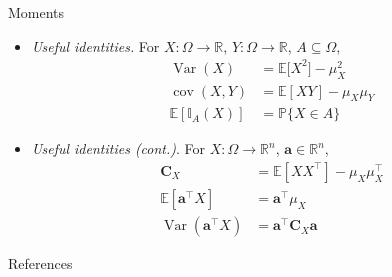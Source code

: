 \documentclass{beamer}
\numberwithin{equation}{section}
\begin{document}
\begin{frame}{Moments}
    \begin{itemize}
        \item
        \textit{Useful identities.} For $ X : \Omega \rightarrow \mathbb{R} $,
        $ Y : \Omega \rightarrow \mathbb{R} $, $ A \subseteq \Omega $,
        \begin{equation*}
            \begin{aligned}
                \operatorname{Var}(X) & = \mathbb{E}\big[X^2\big] - \mu_X^2 \\
                \operatorname{cov}(X, Y) & = \mathbb{E}[XY] - \mu_X\mu_Y \\
                \mathbb{E}[\mathbb{I}_A(X)] & = \mathbb{P}\{X \in A\}
            \end{aligned}
        \end{equation*}

        \item
        \textit{Useful identities (cont.)}. For $ X : \Omega \rightarrow
        \mathbb{R}^n $, $ \mathbf{a} \in \mathbb{R}^n $,
        \begin{equation*}
            \begin{aligned}
                \mathbf{C}_X & = \mathbb{E}\left[XX^\top\right] -
                    \mu_X\mu_X^\top \\
                \mathbb{E}\left[\mathbf{a}^\top X\right] & =
                    \mathbf{a}^\top\mu_X \\
                \operatorname{Var}\left(\mathbf{a}^\top X\right) & =
                    \mathbf{a}^\top\mathbf{C}_X\mathbf{a}
            \end{aligned}
        \end{equation*}
    \end{itemize}
\end{frame}

\begin{frame}{References}
    
    
\end{frame}
\end{document}
